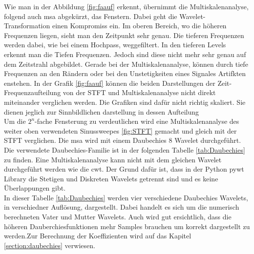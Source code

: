 Wie man in der Abbildung \ref{fig:faauf} erkennt, übernimmt die Multiskalenanalyse, folgend auch msa abgekürzt, das Fenstern. Dabei geht die Wavelet-Transformation einen Kompromiss ein. Im oberen Bereich, wo die höheren Frequenzen liegen, sieht man den Zeitpunkt sehr genau. Die tieferen Frequenzen werden dabei, wie bei einem Hochpass, weggefiltert. In den tieferen Levels erkennt man die Tiefen Frequenzen. Jedoch sind diese nicht mehr sehr genau auf dem Zeitstrahl abgebildet. Gerade bei der Multiskalenanalyse, können durch tiefe Frequenzen an den Rändern oder bei den Unstetigkeiten eines Signales Artifkten enstehen. In der Grafik \ref{fig:faauf} können die beiden Darstellungen der Zeit-Frequenzaufteilung von der STFT und Multiskalenanalyse nicht direkt miteinander verglichen werden. Die Grafiken sind dafür nicht richtig skaliert. Sie dienen jeglich zur Sinnbildlichen darstellung in dessen Aufteilung\\

Um die $2^{n}$-fache Fensterung zu verdeutlichen wird eine  Multiskalenanalyse des weiter oben verwendeten Sinussweepes \ref{fig:STFT} gemacht und gleich mit der STFT verglichen.
Die msa wird mit einem Daubechies 8 Wavelet durchgeführt. Die verwendete Daubechies-Familie ist in der folgenden Tabelle \ref{tab:Daubechies} zu finden. Eine Multiskalenanalyse kann nicht mit dem gleichen Wavelet durchgeführt werden wie die cwt. Der Grund dafür ist, dass in der Python pywt Library die Stetigen und Diskreten Wavelets getrennt sind und es keine Überlappungen gibt. \\
In dieser Tabelle \ref{tab:Daubechies} werden vier verschiedene Daubechies Wavelets, in verschiedner Auflösung, dargestellt. Dabei handelt es sich um die numerisch berechneten Vater und Mutter Wavelets. Auch wird gut ersichtlich, dass die höheren Dauberchiesfunktionen mehr Samples brauchen um korrekt dargestellt zu werden.Zur Berechnung der Koeffizienten wird auf das Kapitel \ref{section:daubechies} verwiesen.\\

